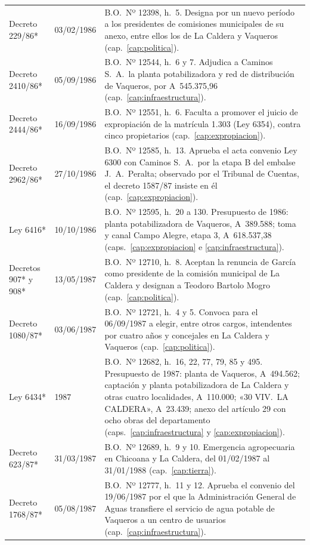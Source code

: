 \begin{longtable}{@{}p{3.2cm}p{1.9cm}p{7.9cm}@{}}
Decreto 229/86* & 03/02/1986 & B.O.\ Nº 12398, h.\ 5. Designa por un nuevo período a los presidentes de comisiones municipales de su anexo, entre ellos los de La Caldera y Vaqueros (cap.\ \ref{cap:politica}). \\
Decreto 2410/86* & 05/09/1986 & B.O.\ Nº 12544, h.\ 6 y 7. Adjudica a Caminos S.\ A.\ la planta potabilizadora y red de distribución de Vaqueros, por A~545.375,96 (cap.\ \ref{cap:infraestructura}). \\
Decreto 2444/86* & 16/09/1986 & B.O.\ Nº 12551, h.\ 6. Faculta a promover el juicio de expropiación de la matrícula 1.303 (Ley 6354), contra cinco propietarios (cap.\ \ref{cap:expropiacion}). \\
Decreto 2962/86* & 27/10/1986 & B.O.\ Nº 12585, h.\ 13. Aprueba el acta convenio Ley 6300 con Caminos S.\ A.\ por la etapa B del embalse J.\ A.\ Peralta; observado por el Tribunal de Cuentas, el decreto 1587/87 insiste en él (cap.\ \ref{cap:expropiacion}). \\
Ley 6416* & 10/10/1986 & B.O.\ Nº 12595, h.\ 20 a 130. Presupuesto de 1986: planta potabilizadora de Vaqueros, A~389.588; toma y canal Campo Alegre, etapa 3, A~618.537,38 (caps.\ \ref{cap:expropiacion} e \ref{cap:infraestructura}). \\
Decretos 907* y 908* & 13/05/1987 & B.O.\ Nº 12710, h.\ 8. Aceptan la renuncia de García como presidente de la comisión municipal de La Caldera y designan a Teodoro Bartolo Mogro (cap.\ \ref{cap:politica}). \\
Decreto 1080/87* & 03/06/1987 & B.O.\ Nº 12721, h.\ 4 y 5. Convoca para el 06/09/1987 a elegir, entre otros cargos, intendentes por cuatro años y concejales en La Caldera y Vaqueros (cap.\ \ref{cap:politica}). \\
Ley 6434* & 1987 & B.O.\ Nº 12682, h.\ 16, 22, 77, 79, 85 y 495. Presupuesto de 1987: planta de Vaqueros, A~494.562; captación y planta potabilizadora de La Caldera y otras cuatro localidades, A~110.000; «30 VIV.\ LA CALDERA», A~23.439; anexo del artículo 29 con ocho obras del departamento (caps.\ \ref{cap:infraestructura} y \ref{cap:expropiacion}). \\
Decreto 623/87* & 31/03/1987 & B.O.\ Nº 12689, h.\ 9 y 10. Emergencia agropecuaria en Chicoana y La Caldera, del 01/02/1987 al 31/01/1988 (cap.\ \ref{cap:tierra}). \\
Decreto 1768/87* & 05/08/1987 & B.O.\ Nº 12777, h.\ 11 y 12. Aprueba el convenio del 19/06/1987 por el que la Administración General de Aguas transfiere el servicio de agua potable de Vaqueros a un centro de usuarios (cap.\ \ref{cap:infraestructura}). \\

\end{longtable}
